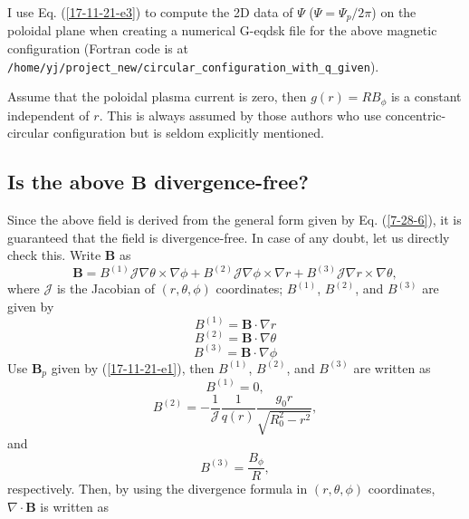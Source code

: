 \documentclass{article}
\newcommand{\code}[1]{\texttt{#1}}
\begin{document}
I use Eq. (\ref{17-11-21-e3}) to compute the 2D data of $\Psi$ ($\Psi = \Psi_p
/ 2 \pi$) on the poloidal plane when creating a numerical G-eqdsk file for the
above magnetic configuration (Fortran code is at
{\code{/home/yj/project\_new/circular\_configuration\_with\_q\_given}}).

Assume that the poloidal plasma current is zero, then $g (r) = R B_{\phi}$ is
a constant independent of $r$. This is always assumed by those authors who use
concentric-circular configuration but is seldom explicitly mentioned.

\subsection{Is the above $\mathbf{B}$ divergence-free?}

Since the above field is derived from the general form given by Eq.
(\ref{7-28-6}), it is guaranteed that the field is divergence-free. In case of
any doubt, let us directly check this. Write $\mathbf{B}$ as
\begin{equation}
  \mathbf{B}= B^{(1)} \mathcal{J} \nabla \theta \times \nabla \phi + B^{(2)}
  \mathcal{J} \nabla \phi \times \nabla r + B^{(3)} \mathcal{J} \nabla r
  \times \nabla \theta,
\end{equation}
where $\mathcal{J}$ is the Jacobian of $(r, \theta, \phi)$ coordinates;
$B^{(1)}$, $B^{(2)}$, and $B^{(3)}$ are given by
\begin{equation}
  B^{(1)} =\mathbf{B} \cdot \nabla r
\end{equation}
\begin{equation}
  B^{(2)} =\mathbf{B} \cdot \nabla \theta
\end{equation}
\begin{equation}
  B^{(3)} =\mathbf{B} \cdot \nabla \phi
\end{equation}
Use $\mathbf{B}_p$ given by (\ref{17-11-21-e1}), then $B^{(1)}$, $B^{(2)}$,
and $B^{(3)}$ are written as
\begin{equation}
  B^{(1)} = 0,
\end{equation}
\begin{equation}
  B^{(2)} = - \frac{1}{\mathcal{J}}  \frac{1}{q (r)}  \frac{g_0 r}{\sqrt{R_0^2
  - r^2}},
\end{equation}
and
\begin{equation}
  B^{(3)} = \frac{B_{\phi}}{R},
\end{equation}
respectively. Then, by using the divergence formula in $(r, \theta, \phi)$
coordinates, $\nabla \cdot \mathbf{B}$ is written as
\end{document}

